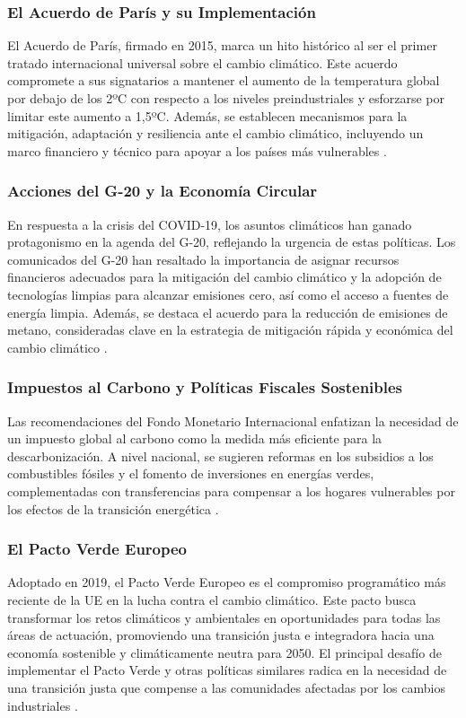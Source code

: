 \documentclass[main.tex]{subfiles}
\begin{document}
\subsubsection{El Acuerdo de París y su Implementación}
El Acuerdo de París, firmado en 2015, marca un hito histórico al ser el primer tratado internacional universal sobre el cambio climático. Este acuerdo compromete a sus signatarios a mantener el aumento de la temperatura global por debajo de los 2ºC con respecto a los niveles preindustriales y esforzarse por limitar este aumento a 1,5ºC. Además, se establecen mecanismos para la mitigación, adaptación y resiliencia ante el cambio climático, incluyendo un marco financiero y técnico para apoyar a los países más vulnerables \cite{dormido2022cambio}.

\subsubsection{Acciones del G-20 y la Economía Circular}
En respuesta a la crisis del COVID-19, los asuntos climáticos han ganado protagonismo en la agenda del G-20, reflejando la urgencia de estas políticas. Los comunicados del G-20 han resaltado la importancia de asignar recursos financieros adecuados para la mitigación del cambio climático y la adopción de tecnologías limpias para alcanzar emisiones cero, así como el acceso a fuentes de energía limpia. Además, se destaca el acuerdo para la reducción de emisiones de metano, consideradas clave en la estrategia de mitigación rápida y económica del cambio climático \cite{dormido2022cambio}.

\subsubsection{Impuestos al Carbono y Políticas Fiscales Sostenibles}
Las recomendaciones del Fondo Monetario Internacional enfatizan la necesidad de un impuesto global al carbono como la medida más eficiente para la descarbonización. A nivel nacional, se sugieren reformas en los subsidios a los combustibles fósiles y el fomento de inversiones en energías verdes, complementadas con transferencias para compensar a los hogares vulnerables por los efectos de la transición energética \cite{dormido2022cambio}.

\subsubsection{El Pacto Verde Europeo}
Adoptado en 2019, el Pacto Verde Europeo es el compromiso programático más reciente de la UE en la lucha contra el cambio climático. Este pacto busca transformar los retos climáticos y ambientales en oportunidades para todas las áreas de actuación, promoviendo una transición justa e integradora hacia una economía sostenible y climáticamente neutra para 2050. El principal desafío de implementar el Pacto Verde y otras políticas similares radica en la necesidad de una transición justa que compense a las comunidades afectadas por los cambios industriales \cite{dormido2022cambio}.
\end{document}
